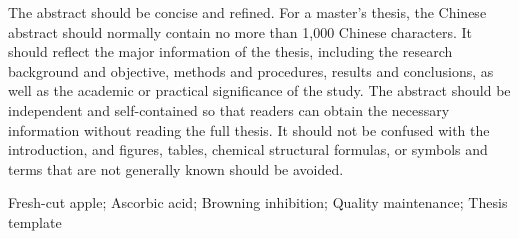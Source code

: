 \QAUabstracttitleEN

{\qauTimes\fontsize{10.5bp}{15.75bp}\selectfont
The abstract should be concise and refined. For a master's thesis, the Chinese abstract should normally contain no more than 1,000 Chinese characters. It should reflect the major information of the thesis, including the research background and objective, methods and procedures, results and conclusions, as well as the academic or practical significance of the study. The abstract should be independent and self-contained so that readers can obtain the necessary information without reading the full thesis. It should not be confused with the introduction, and figures, tables, chemical structural formulas, or symbols and terms that are not generally known should be avoided.\par}

\vspace{0.5\baselineskip}

{\qauTimes\fontsize{10.5bp}{15.75bp}\selectfont
\noindent\hspace*{2em}{\bfseries Keywords: }Fresh-cut apple; Ascorbic acid; Browning inhibition; Quality maintenance; Thesis template\par}

